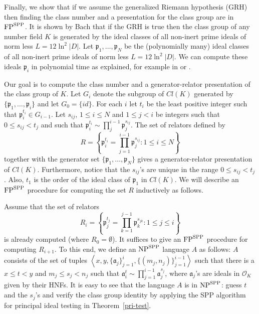 \documentclass{article}
\newcommand{\FP}{{\rm FP}}
\newcommand{\NP}{{\rm NP}}
\newcommand{\SPP}{{\rm SPP}}
\theoremstyle{definition}\newtheorem{remark}[theorem]{Remark}
\begin{document}
Finally, we show that if we assume the generalized Riemann hypothesis
(GRH) then finding the class number and a presentation for the class
group are in $\FP^{\SPP}$. It is shown by Bach \cite{bach90grh} that
if the GRH is true then the class group of any number field $K$ is
generated by the ideal classes of all non-inert prime ideals of norm
less $L = 12 \ln^2{|D|}$. Let $\mathfrak{p}_1,\ldots,\mathfrak{p}_N$
be the (polynomially many) ideal classes of all non-inert prime ideals
of norm less $L = 12 \ln^2{|D|}$. We can compute these ideals
$\mathfrak{p}_i$ in polynomial time as explained, for example in
\cite[Section 6.2.5]{cohen:1993} or \cite{buchmann:lenstra}.

Our goal is to compute the class number and a generator-relator
presentation of the class group of $K$.  Let $G_i$ denote the subgroup
of $Cl(K)$ generated by $\{\mathfrak{p}_1,\ldots,\mathfrak{p}_i\}$ and
let $G_0 = \{ id \}$. For each $i$ let $t_i$ be the least positive
integer such that $\mathfrak{p}_i^{t_i} \in G_{i-1}$. Let $s_{ij}$, $1
\leq i \leq N$ and $1 \leq j < i$ be integers such that $0 \leq s_{ij}
< t_j$ and such that $\mathfrak{p}_i^{t_i} \sim \prod_j^{i-1}
\mathfrak{p}_j^{s_{ij}}$. The set of relators defined by
\[
R = \left\{ \mathfrak{p}_i^{t_i} = \prod_{j=1}^{i-1} \mathfrak{p}_j^{s_{ij}} :
1 \leq i \leq N \right\}
\]
together with the generator set $\{
\mathfrak{p}_1,\ldots,\mathfrak{p}_N \}$ gives a generator-relator
presentation of $Cl(K)$. Furthermore, notice that the $s_{ij}$'s are
unique in the range $0 \leq s_{ij} < t_j$. Also, $t_1$ is the order of
the ideal class of $\mathfrak{p}_1$ in $Cl(K)$. We will describe an
$\FP^{\SPP}$ procedure for computing the set $R$ inductively as
follows.

Assume that the set of relators
\[
R_i = \left\{ \mathfrak{p}_j^{t_j} = \prod_{k=1}^{j-1}
\mathfrak{p}_k^{s_{jk}}: 1 \leq j \leq i \right\}
\]
is already computed (where $R_0=\emptyset$). It suffices to give an
$\FP^\SPP$ procedure for computing $R_{i+1}$. To this end, we define
an $\NP^\SPP$ language $A$ as follows: $A$ consists of the set of
tuples $\left\langle
  x,y,\{\mathfrak{a}_j\}_{j=1}^i,
\{(m_j,n_j)\}_{j=1}^{i-1}\right\rangle$
such that there is a $x \leq t < y$ and $m_j \leq s_j < n_j$ such that
$\mathfrak{a}_i^t \sim \prod_{j=1}^{i-1} \mathfrak{a}_j^{s_j}$, where
$\mathfrak{a}_j$'s are ideals in $\mathcal{O}_K$ given by their HNFs.
It is easy to see that the language $A$ is in $\NP^\SPP$: guess $t$
and the $s_j$'s and verify the class group identity by applying the
SPP algorithm for principal ideal testing in Theorem~\ref{pri-test}.
\end{document}
